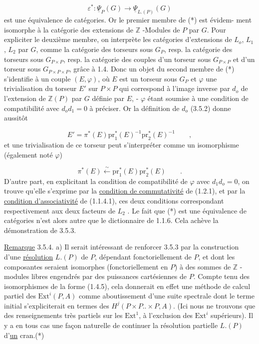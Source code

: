 \begin{equation*}
\varepsilon^* : \underline{\Psi}_P(G) \longrightarrow \underline{\Psi}_{L.(P)}(G)
\end{equation*}
est une équivalence de catégories. Or le premier membre de (*) est évidem-
ment isomorphe à la catégorie des extensions de $\mathbb{Z}$ -Modules de $P$ par $G$. Pour expliciter le deuxième membre, on interprète les catégories d'extensions de $L_o$, $L_1$, $L_2$ par $G$, comme la catégorie des torseurs sous $G_P$, resp. la catégorie des torseurs sous $G_{P \times P}$, resp. la catégorie des couples d'un torseur sous $G_{P \times P}$ et d'un torseur sous $G_{P \times P \times P}$, grâce à 1.4. Donc un objet du second membre de (*) s'identifie à un couple $(E,\varphi)$, où $E$ est un torseur sous $G_P$ et $\varphi$ une trivialisation du torseur $E'$ sur $P \times P$ qui correspond à l'image inverse par $d_o$ de l'extension de $\mathbb{Z}(P)$ par $G$ définie par $E$, - $\varphi$ étant soumise à une condition de compatibilité avec $d_o d_1 = 0$ à préciser. Or la définition de $d_o$ (3.5.2) donne aussitôt

\begin{equation*}
E' = \pi^*(E)\mathrm{pr}_1^*(E)^{-1}\mathrm{pr}_2^*(E)^{-1} \qquad ,
\end{equation*}
et une trivialisation de ce torseur peut s'interpréter comme un isomorphisme (également noté $\varphi$)

\begin{equation*}
\pi^*(E) \xleftarrow{\sim} \mathrm{pr}_1^*(E)\mathrm{pr}_2^*(E) \qquad .
\end{equation*}
D'autre part, en explicitant la condition de compatibilité de $\varphi$ avec $d_1 d_o = 0$, on trouve qu'elle s'exprime par la \underline{condition de commutativité} de (1.2.1), et par la \underline{condition d'associativité} de (1.1.4.1), ces deux conditions correspondant respectivement aux deux facteurs de $L_2$ . Le fait que (*) est une équivalence de catégories n'est alors autre que le dictionnaire de 1.1.6. Cela achève la démonstration de 3.5.3.

\underline{Remarque} 3.5.4. a)  Il serait intéressant de renforcer 3.5.3 par la construction d'une \underline{résolution} $L.(P)$ de $P$, dépendant fonctoriellement de $P$, et dont les composantes seraient isomorphes (fonctoriellement en $P$) à des sommes de $\mathbb{Z}$ -modules libres engendrés par des puissances cartésiennes
de $P$. Compte tenu des isomorphismes de la forme (1.4.5), cela donnerait en effet une méthode de calcul partiel des $\mathrm{Ext}^i(P,A)$ comme aboutissement d'une suite spectrale dont le terme  initial s'expliciterait en termes des $H^j(P \times P .. \times P, A)$. (Ici nous ne trouvons que des renseignements très partiels sur les $\mathrm{Ext}^1$, à l'exclusion des $\mathrm{Ext}^i$ supérieurs). Il y a en tous cas une façon naturelle de continuer la résolution partielle $L.(P)$ d'\underline{un} cran.(*)

